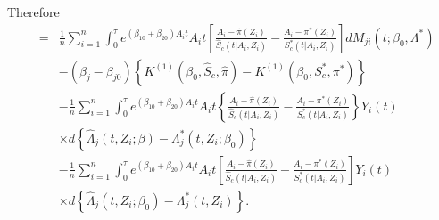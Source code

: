 \documentclass[11pt]{article}
\newcommand{\ee}{\end{eqnarray}}
\newcommand{\be}{\begin{eqnarray}}
\begin{document}
\begin{newproof7}
Therefore
\be\label{32}
&=&\frac{1}{n}\sum_{i=1}^n\int_0^\tau e^{ (\beta_{10}  + \beta_{20})A_i t}A_i t \left[\frac{A_i -\hat \pi( Z_i)}{\hat S_c(t | A_i,Z_i)}-\frac{A_i -\pi^{*}( Z_i)}{S^{*}_c(t | A_i,Z_i)}\right]dM_{ji}(t ; \beta_{0}, \Lambda^{*})\nonumber\\
&&-(\beta_j-\beta_{j0})\left\{K^{(1)}(\beta_0,\hat S_c, \hat \pi)-K^{(1)}(\beta_0,S^{*}_c, \pi^{*})\right\}\nonumber\\
&&-\frac{1}{n}\sum_{i=1}^n\int_0^\tau e^{ (\beta_{10}  + \beta_{20})A_i t}A_i t \left\{\frac{A_i -\hat \pi( Z_i)}{\hat S_c(t | A_i,Z_i)}-\frac{A_i -\pi^{*}( Z_i)}{S^{*}_c(t | A_i,Z_i)}\right\}Y_i(t)
\nonumber\\
&&\times d\left\{\hat \Lambda_j(t,Z_i ; \beta)-\Lambda^{*}_j(t,Z_i; \beta_0)\right\}\nonumber\\
&&-\frac{1}{n}\sum_{i=1}^n\int_0^\tau e^{ (\beta_{10}  + \beta_{20})A_i t}A_i t \left[\frac{A_i -\hat \pi( Z_i)}{\hat S_c(t | A_i,Z_i)}-\frac{A_i -\pi^{*}( Z_i)}{S^{*}_c(t | A_i,Z_i)}\right]Y_i(t)
\nonumber\\&&\times d\left\{\hat \Lambda_j(t,Z_i ; \beta_0)-\Lambda_j^{*}(t,Z_i)\right\}.\nonumber\\
\ee


\end{newproof7}
\end{document}

